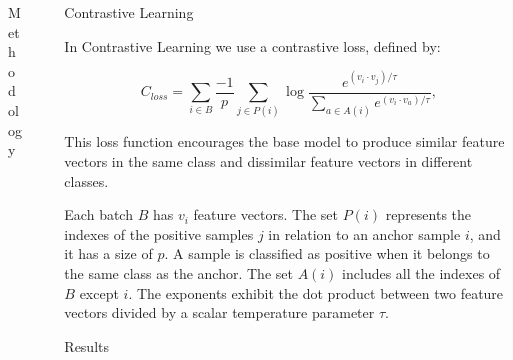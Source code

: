 \documentclass[final]{beamer}
\newlength{\sepwidth}
\newlength{\colwidth}
\newcommand{\separatorcolumn}{\begin{column}{\sepwidth}\end{column}}
\begin{document}
\begin{frame}[t]
\begin{columns}[t]
\begin{column}{\colwidth}
\begin{block}{Methodology}
  \end{block}

\end{column}

\separatorcolumn

\begin{column}{\colwidth}

  \begin{exampleblock}{Contrastive Learning}

    In Contrastive Learning we use a contrastive loss, defined by:

    \begin{equation}
      C_{loss} = \sum_{i \in B} \frac{-1}{p} \sum_{j \in P(i)} \log \frac{e^{(v_i \cdot v_j) / \tau}}{\sum\limits_{a \in A(i)} e^{(v_i \cdot v_a) / \tau}}
      \label{eq:con_loss}\text{,}
    \end{equation}

    This loss function encourages the base model to produce
    similar feature vectors in the same class and dissimilar feature vectors in 
    different classes.


    Each batch $B$ has $v_i$ feature vectors. The set $P(i)$ 
    represents the indexes of the positive samples $j$ in relation to an anchor 
    sample $i$, and it has a size of $p$. A sample is classified as positive when 
    it belongs to the same class as the anchor. The set $A(i)$ includes all
    the indexes of $B$ except $i$. The exponents exhibit the dot product between 
    two feature vectors divided by a scalar temperature parameter $\tau$.

  \end{exampleblock}
  \begin{block}{Results}

    \def\globalCMscale{1.9}


\end{block}
\end{column}
\end{columns}
\end{frame}
\end{document}

